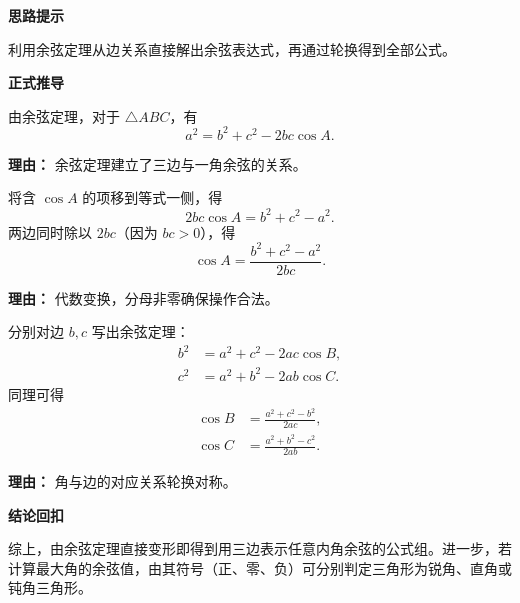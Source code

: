 \begin{proofbox}
	\textbf{\textcolor{CProof}{思路提示}}

	利用余弦定理从边关系直接解出余弦表达式，再通过轮换得到全部公式。

	\medskip
	\textbf{\textcolor{CProof}{正式推导}}
	\begin{description}[style=nextline, leftmargin=2.8em, labelsep=0.5em, itemsep=0.55em]
		\item[\textbf{步骤一（余弦定理）：}]
			由余弦定理，对于 $\triangle ABC$，有
			\[
				a^{2} = b^{2} + c^{2} - 2bc\cos A.
			\]
			\par\textbf{理由：} 余弦定理建立了三边与一角余弦的关系。

		\item[\textbf{步骤二（解出 $\cos A$）：}]
			将含 $\cos A$ 的项移到等式一侧，得
			\[
				2bc\cos A = b^{2} + c^{2} - a^{2}.
			\]
			两边同时除以 $2bc$（因为 $bc>0$），得
			\[
				\cos A = \frac{b^{2}+c^{2}-a^{2}}{2bc}.
			\]
			\par\textbf{理由：} 代数变换，分母非零确保操作合法。

		\item[\textbf{步骤三（轮换公式）：}]
			分别对边 $b,c$ 写出余弦定理：
			\[
				\begin{aligned}
					b^{2} &= a^{2}+c^{2}-2ac\cos B,\\
					c^{2} &= a^{2}+b^{2}-2ab\cos C.
			\end{aligned}
			\]
			同理可得
			\[
				\begin{aligned}
					\cos B &= \frac{a^{2}+c^{2}-b^{2}}{2ac},\\
					\cos C &= \frac{a^{2}+b^{2}-c^{2}}{2ab}.
			\end{aligned}
			\]
			\par\textbf{理由：} 角与边的对应关系轮换对称。
	\end{description}

	\medskip
	\textbf{\textcolor{CProof}{结论回扣}}

	综上，由余弦定理直接变形即得到用三边表示任意内角余弦的公式组。进一步，若计算最大角的余弦值，由其符号（正、零、负）可分别判定三角形为锐角、直角或钝角三角形。
\end{proofbox}
